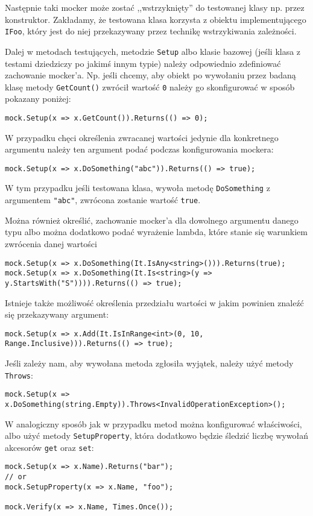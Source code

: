 Następnie taki mocker może zostać ,,wstrzyknięty'' do testowanej klasy np. przez konstruktor. Zakładamy, że testowana klasa korzysta z obiektu implementującego \texttt{IFoo}, który jest do niej przekazywany przez technikę wstrzykiwania zależności.

Dalej w metodach testujących, metodzie \texttt{Setup} albo klasie bazowej (jeśli klasa z testami dziedziczy po jakimś innym typie) należy odpowiednio zdefiniować zachowanie mocker'a. Np. jeśli chcemy, aby obiekt po wywołaniu przez badaną klasę metody \texttt{GetCount()} zwrócił wartość \texttt{0} należy go skonfigurować w sposób pokazany poniżej:
\begin{lstlisting}
mock.Setup(x => x.GetCount()).Returns(() => 0);
\end{lstlisting}


W przypadku chęci określenia zwracanej wartości jedynie dla konkretnego argumentu należy ten argument podać podczas konfigurowania mockera:
\begin{lstlisting}
mock.Setup(x => x.DoSomething("abc")).Returns(() => true);
\end{lstlisting}
W tym przypadku jeśli testowana klasa, wywoła metodę \texttt{DoSomething} z argumentem \texttt{"abc"}, zwrócona zostanie wartość \texttt{true}.

Można również określić, zachowanie mocker'a dla dowolnego argumentu danego typu albo można dodatkowo podać wyrażenie lambda, które stanie się warunkiem zwrócenia danej wartości
\begin{lstlisting}
mock.Setup(x => x.DoSomething(It.IsAny<string>())).Returns(true);
mock.Setup(x => x.DoSomething(It.Is<string>(y => y.StartsWith("S")))).Returns(() => true);
\end{lstlisting}

Istnieje także możliwość określenia przedziału wartości w jakim powinien znaleźć się przekazywany argument:
\begin{lstlisting}
mock.Setup(x => x.Add(It.IsInRange<int>(0, 10, Range.Inclusive))).Returns(() => true); 
\end{lstlisting}

Jeśli zależy nam, aby wywołana metoda zgłosiła wyjątek, należy użyć metody \texttt{Throws}:
\begin{lstlisting}
mock.Setup(x => x.DoSomething(string.Empty)).Throws<InvalidOperationException>();
\end{lstlisting}

W analogiczny sposób jak w przypadku metod można konfigurować właściwości, albo użyć metody \texttt{SetupProperty}, która dodatkowo będzie śledzić liczbę wywołań akcesorów \texttt{get} oraz \texttt{set}:
\begin{lstlisting}
mock.Setup(x => x.Name).Returns("bar");
// or
mock.SetupProperty(x => x.Name, "foo");

mock.Verify(x => x.Name, Times.Once());
\end{lstlisting}

